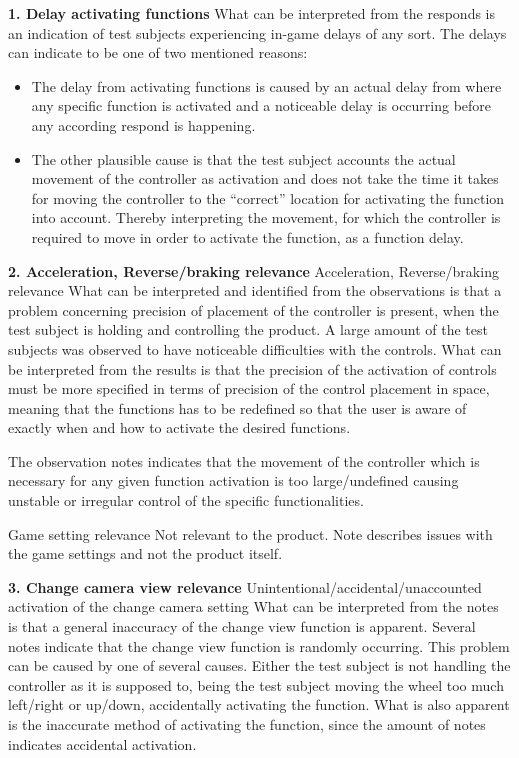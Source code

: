 \noindent\textbf{1. Delay activating functions}\newline
What can be interpreted from the responds is an indication of test subjects experiencing in-game delays of any sort. 
The delays can indicate to be one of two mentioned reasons:
\begin{itemize}
\item The delay from activating functions is caused by an actual delay from where any specific function is activated and a noticeable delay is occurring before any according respond is happening.
\item The other plausible cause is that the test subject accounts the actual movement of the controller as activation and does not take the time it takes for moving the controller to the “correct” location for activating the function into account. Thereby interpreting the movement, for which the controller is required to move in order to activate the function, as a function delay.
\end{itemize}
\bigskip

\noindent\textbf{2. Acceleration, Reverse/braking relevance}\newline
{} Acceleration, Reverse/braking relevance\newline
What can be interpreted and identified from the observations is that a problem concerning precision of placement of the controller is present, when the test subject is holding and controlling the product. 
A large amount of the test subjects was observed to have noticeable difficulties with the controls. 
What can be interpreted from the results is that the precision of the activation of controls must be more specified in terms of precision of the control placement in space, meaning that the functions has to be redefined so that the user is aware of exactly when and how to activate the desired functions.


The observation notes indicates that the movement of the controller which is necessary for any given function activation is too large/undefined causing unstable or irregular control of the specific functionalities.
\bigskip

 Game setting relevance\newline
Not relevant to the product. Note describes issues with the game settings and not the product itself.
\bigskip

\noindent\textbf{3. Change camera view relevance}\newline
{} Unintentional/accidental/unaccounted activation of the change camera setting\newline
What can be interpreted from the notes is that a general inaccuracy of the change view function is apparent. 
Several notes indicate that the change view function is randomly occurring. 
This problem can be caused by one of several causes. 
Either the test subject is not handling the controller as it is supposed to, being the test subject moving the wheel too much left/right or up/down, accidentally activating the function. 
What is also apparent is the inaccurate method of activating the function, since the amount of notes indicates accidental activation.
\bigskip

